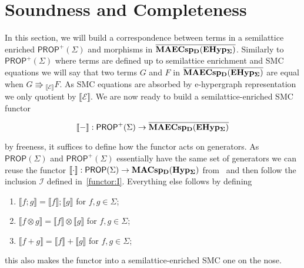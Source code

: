 \section{Soundness and Completeness}

In this section, we will build a correspondence between terms in a semilattice enriched $\textsf{PROP}^{+}(\Sigma)$ and morphisms in ${\mathbf{\overline{MAECsp_{D}(EHyp_{\Sigma})}}}$. Similarly to $\textsf{PROP}^{+}(\Sigma)$ where terms are defined up to semilattice enrichment and SMC equations we will say that two terms $G$ and $F$ in ${\mathbf{\overline{MAECsp_{D}(EHyp_{\Sigma})}}}$ are equal when $G \Rrightarrow{}_{\llbracket \mathcal{E} \rrbracket} F$. As SMC equations are absorbed by e-hypergraph representation we only quotient by $\llbracket \mathcal{E} \rrbracket$. We are now ready to build a semilattice-enriched SMC functor 

\[
\llbracket - \rrbracket : \textsf{PROP}^{+}(\Sigma) \to {\mathbf{\overline{MAECsp_{D}(EHyp_{\Sigma})}}}
\]

by freeness, it suffices to define how the functor acts on generators. As $\textsf{PROP}(\Sigma)$ and $\textsf{PROP}^{+}(\Sigma)$ essentially have the same set of generators we can reuse the functor $\llbracket \cdot \rrbracket: \textsf{PROP}(\Sigma) \to \mathbf{MACsp_{D}(Hyp_{\Sigma})}$ from~\cite{Frobenius2} and then follow the inclusion $\mathcal{I}$ defined in~\ref{functor:I}. Everything else follows by defining

\begin{enumerate}
    \item $\llbracket f;g \rrbracket = \llbracket f \rrbracket ; \llbracket g \rrbracket$  for $f,g \in \Sigma$;
    \item $\llbracket f \otimes g \rrbracket = \llbracket f \rrbracket \otimes \llbracket g \rrbracket$  for $f,g \in \Sigma$;
    \item $\llbracket f + g \rrbracket = \llbracket f \rrbracket + \llbracket g \rrbracket$  for $f,g \in \Sigma$;
\end{enumerate}

this also makes the functor into a semilattice-enriched SMC one on the nose.


